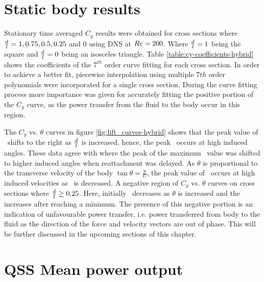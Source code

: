 \section{Static body results}
\label{sec:cross-sec-Static body results}


Stationary time averaged $C_y$ results were obtained for cross sections where $\frac{d}{l}=1,0.75,0.5,0.25$ and $0$ using DNS at $Re=200$. Where $\frac{d}{l}=1$ being the square and $\frac{d}{l}=0$ being an isosceles  triangle. Table \ref{table:cy-coefficients-hybrid} shows the coefficients of the $7^{th}$ order curve fitting for each cross section. In order to achieve a better fit, piecewise interpolation using multiple $7th$ order polynomials were incorporated for a single cross section. During the curve fitting process more importance was given for accurately fitting  the positive portion of the $C_{y}$ curve, as the power transfer from the fluid to the body occur in this region. 

 

The $C_y$ vs. $\theta$ curves in figure \ref{fig:lift_curves-hybrid} shows that the peak value of \cy\ shifts to the right as $\frac{d}{l}$ is increased, hence, the peak \cy\ occurs at high induced angles.  These data agree with \citet{Luo1994} where the peak of the maximum \cy\ value was shifted to higher induced angles when reattachment was delayed. As $\theta$ is proportional to the transverse velocity of the body $\tan{\theta}=\frac{\dot{y}}{U}$, the peak value of \cy\ occurs at high induced velocities as \ratio\ is decreased. A negative region of $C_y$ vs. $\theta$ curves on cross sections where $\frac{d}{l}\geq0.25$. Here, initially \cy\ decreases as $\theta$ is increased and the increases after reaching a minimum. The presence of this negative portion is an indication of unfavourable power transfer, i.e. power transferred from body to the fluid as the direction of the force and velocity vectors are out of phase. This will be further discussed in the upcoming sections of this chapter.    

 
 
 \section{QSS Mean power output}
 \label{sec:cross-sec-qss-mean power}
 
 
 
